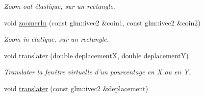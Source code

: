 \begin{DoxyCompactItemize}
\begin{DoxyCompactList}\small\item\em Zoom out élastique, sur un rectangle. \end{DoxyCompactList}\item 
void \hyperlink{classvue_1_1_projection_ortho_a54482116f4c588f0404bc1a80926ab06}{zoomer\-In} (const glm\-::ivec2 \&coin1, const glm\-::ivec2 \&coin2)
\begin{DoxyCompactList}\small\item\em Zoom in élatique, sur un rectangle. \end{DoxyCompactList}\item 
\hypertarget{classvue_1_1_projection_ortho_ab0b91a56bb059b3cb53c53c196fa9ad8}{void \hyperlink{classvue_1_1_projection_ortho_ab0b91a56bb059b3cb53c53c196fa9ad8}{translater} (double deplacement\-X, double deplacement\-Y)}\label{classvue_1_1_projection_ortho_ab0b91a56bb059b3cb53c53c196fa9ad8}

\begin{DoxyCompactList}\small\item\em Translater la fenêtre virtuelle d'un pourcentage en {\itshape X} ou en {\itshape Y}. \end{DoxyCompactList}\item 
\hypertarget{classvue_1_1_projection_ortho_af54b17d42826b1ebb396edf22ff66811}{void \hyperlink{classvue_1_1_projection_ortho_af54b17d42826b1ebb396edf22ff66811}{translater} (const glm\-::ivec2 \&deplacement)}\label{classvue_1_1_projection_ortho_af54b17d42826b1ebb396edf22ff66811}


\end{DoxyCompactItemize}

